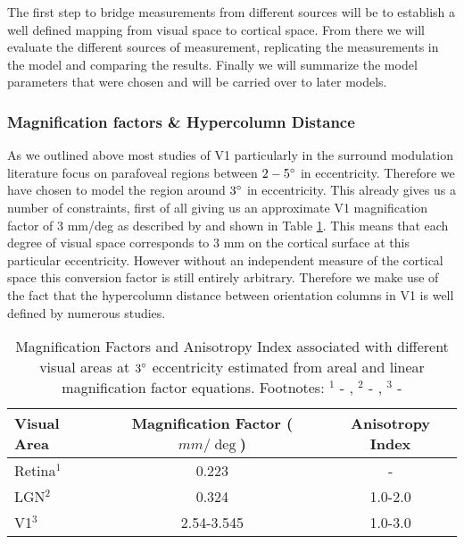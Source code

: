 The first step to bridge measurements from different sources will be
to establish a well defined mapping from visual space to cortical
space. From there we will evaluate the different sources of
measurement, replicating the measurements in the model and comparing
the results. Finally we will summarize the model parameters that were
chosen and will be carried over to later models.

\subsubsection{Magnification factors \& Hypercolumn Distance}

As we outlined above most studies of V1 particularly in the surround
modulation literature focus on parafoveal regions between $2-5\degree$
in eccentricity. Therefore we have chosen to model the region around
$3\degree$ in eccentricity. This already gives us a number of
constraints, first of all giving us an approximate V1 magnification
factor of 3 mm/deg as described by \cite{VanEssen1984} and shown in
Table \ref{MFs}. This means that each degree of visual space
corresponds to 3 mm on the cortical surface at this particular
eccentricity. However without an independent measure of the cortical
space this conversion factor is still entirely arbitrary. Therefore we
make use of the fact that the hypercolumn distance between orientation
columns in V1 is well defined by numerous studies.

\begin{table}
\centering
\begin{tabular}{l | c c}
  \hline
  \hline
  Visual Area     & Magnification Factor ($mm/\deg$) & Anisotropy Index \\
  \hline
  Retina$^1$      & 0.223                            & -                      \\
  LGN$^2$         & 0.324                             & 1.0-2.0                \\
  V1$^3$          & 2.54-3.545                       & 1.0-3.0                \\
  \hline
\end{tabular}
\caption[]%
{Magnification Factors and Anisotropy Index associated with different
  visual areas at $3\degree$ eccentricity estimated from areal and
  linear magnification factor equations. Footnotes: $^1$ -
  \cite{Perry1985}, $^2$ - \cite{Connolly1984}, $^3$ -
  \cite{VanEssen1984}}
\label{MFs}
\end{table}

